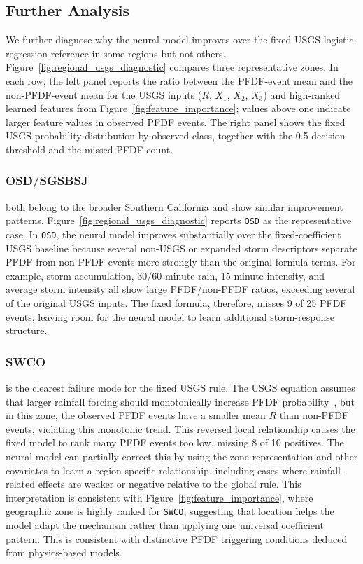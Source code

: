 \subsection{Further Analysis}\label{sec-analysis}
We further diagnose why the neural model improves over the fixed USGS logistic-regression reference in some regions but not others. Figure~\ref{fig:regional_usgs_diagnostic} compares three representative zones. In each row, the left panel reports the ratio between the PFDF-event mean and the non-PFDF-event mean for the USGS inputs ($R$, $X_1$, $X_2$, $X_3$) and high-ranked learned features from Figure~\ref{fig:feature_importance}; values above one indicate larger feature values in observed PFDF events. The right panel shows the fixed USGS probability distribution by observed class, together with the 0.5 decision threshold and the missed PFDF count. 


\subsubsection{OSD/SGSBSJ} both belong to the broader Southern California and show similar improvement patterns. Figure~\ref{fig:regional_usgs_diagnostic} reports \texttt{OSD} as the representative case. In \texttt{OSD}, the neural model improves substantially over the fixed-coefficient USGS baseline because several non-USGS or expanded storm descriptors separate PFDF from non-PFDF events more strongly than the original formula terms. For example, storm accumulation, 30/60-minute rain, 15-minute intensity, and average storm intensity all show large PFDF/non-PFDF ratios, exceeding several of the original USGS inputs. The fixed formula, therefore, misses 9 of 25 PFDF events, leaving room for the neural model to learn additional storm-response structure.

\subsubsection{SWCO} is the clearest failure mode for the fixed USGS rule. The USGS equation assumes that larger rainfall forcing should monotonically increase PFDF probability~\cite{staley2016, staley2016updated, staley2017prediction}, but in this zone, the observed PFDF events have a smaller mean $R$ than non-PFDF events, violating this monotonic trend. This reversed local relationship causes the fixed model to rank many PFDF events too low, missing 8 of 10 positives. The neural model can partially correct this by using the zone representation and other covariates to learn a region-specific relationship, including cases where rainfall-related effects are weaker or negative relative to the global rule. This interpretation is consistent with Figure~\ref{fig:feature_importance}, where geographic zone is highly ranked for \texttt{SWCO}, suggesting that location helps the model adapt the mechanism rather than applying one universal coefficient pattern. This is consistent with distinctive PFDF triggering conditions deduced from physics-based models. 

